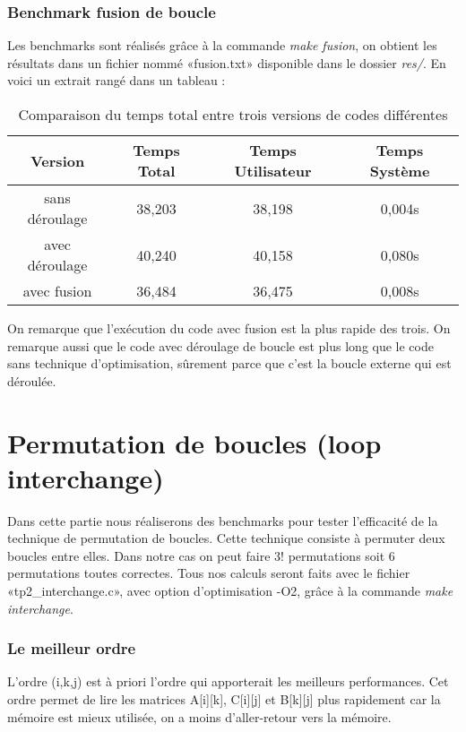 \documentclass{rapport}
\begin{document}
\section{Benchmark fusion de boucle}
Les benchmarks sont réalisés grâce à la commande \textit{make fusion}, on obtient les résultats dans un fichier nommé «fusion.txt» disponible dans le dossier \textit{res/}. En voici un extrait rangé dans un tableau :
\begin{table}[H]
    \centering
    \begin{tabular}{|c|c|c|c|}
        \hline
        Version & Temps Total & Temps Utilisateur & Temps Système \\
        \hline
        sans déroulage & 38,203 & 38,198 & 0,004s \\
        \hline
        avec déroulage & 40,240 & 40,158 & 0,080s \\
        \hline
        avec fusion & 36,484 & 36,475 & 0,008s \\
        \hline
    \end{tabular}
    \caption{Comparaison du temps total entre trois versions de codes différentes}
\end{table}
On remarque que l'exécution du code avec fusion est la plus rapide des trois. On remarque aussi que le code avec déroulage de boucle est plus long que le code sans technique d'optimisation, sûrement parce que c'est la boucle externe qui est déroulée.
\clearpage
\part{Permutation de boucles (loop interchange)}\setcounter{section}{0}
Dans cette partie nous réaliserons des benchmarks pour tester l'efficacité de la technique de permutation de boucles.
Cette technique consiste à permuter deux boucles entre elles. Dans notre cas on peut faire 3! permutations soit 6 permutations toutes correctes. Tous nos calculs seront faits avec le fichier «tp2\_interchange.c», avec option d'optimisation -O2, grâce à la commande \textit{make interchange}.

\section{Le meilleur ordre}
L'ordre (i,k,j) est à priori l'ordre qui apporterait les meilleurs performances. Cet ordre permet de lire les matrices A[i][k], C[i][j] et B[k][j] plus rapidement car la mémoire est mieux utilisée, on a moins d'aller-retour vers la mémoire.
\end{document}
